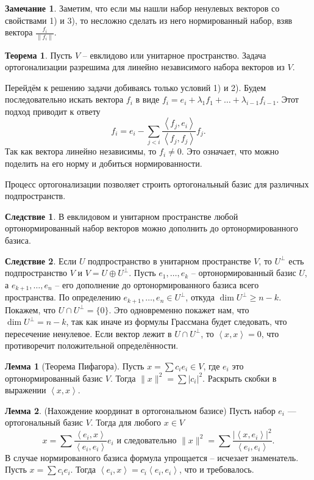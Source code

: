 \documentclass[10pt,a4paper,oneside]{book}
\theoremstyle{definition}
\newtheorem*{rem}{Замечание}
\newtheorem{thm}{Теорема}
\newtheorem{lem}{Лемма}
\newtheorem{cor}{Следствие}
\def\lan{\left\langle }
\def\ran{\right\rangle}
\def\thrm{\begin{thm}}
\def\ethrm{\end{thm}}
\def\lm{\begin{lem}}
\def\elm{\end{lem}}
\def\crl{\begin{cor}}
\def\ecrl{\end{cor}}
\def\rm{\begin{rem}}
\def\erm{\end{rem}}
\begin{document}
\rm Заметим, что если мы нашли набор ненулевых векторов со свойствами 1) и 3), то несложно сделать из него нормированный набор, взяв вектора $\frac{f_i}{\|f_i\|}$. 
\erm

\thrm Пусть $V$ -- евклидово или унитарное пространство. Задача ортогонализации разрешима для линейно независимого набора векторов из $V$.
\proof

Перейдём к решению задачи добиваясь только условий 1) и 2). Будем последовательно искать вектора $f_i$ в виде $f_i=e_i+\lambda_1 f_1 +\dots + \lambda_{i-1} f_{i-1}$. Этот подход приводит к ответу
$$f_i=e_i-\sum_{j<i} \frac{\lan f_j,e_i\ran}{\lan f_j,f_j\ran}f_j.$$
Так как вектора линейно независимы, то $f_i\neq 0$. Это означает, что можно поделить на его норму и добиться нормированности.
\endproof
\ethrm


Процесс ортогонализации позволяет строить ортогональный базис для различных подпространств.

\crl В евклидовом и унитарном пространстве любой ортонормированный набор векторов можно дополнить до ортонормированного базиса.
\ecrl

\crl Если $U$ подпространство в унитарном пространстве $V$, то $U^{\bot}$ есть подпространство $V$ и  $V= U \oplus U^{\bot}$. 
\proof Пусть $e_1,\dots,e_k$ -- ортонормированный базис $U$, а $e_{k+1}, \dots, e_n$ -- его дополнение до ортонормированного базиса всего пространства. По определению $e_{k+1},\dots,e_n \in U^{\bot}$, откуда $\dim U^{\bot} \geq n-k$. Покажем, что $U\cap U^{\bot}=\{0\}$. Это одновременно покажет нам, что $\dim U^{\bot}=n-k$, так как иначе из формулы Грассмана будет следовать, что пересечение ненулевое.
Если вектор лежит в $U\cap U^{\bot}$, то $\lan x,x\ran=0$, что противоречит положительной определённости.
\endproof
\ecrl

\lm[Теорема Пифагора] Пусть $x= \sum c_i e_i \in V$, где $e_i$ это ортонормированный базис $V$. Тогда $\|x\|^2=\sum |c_i|^2$.
\proof Раскрыть скобки в выражении $\lan x,x\ran$.
\endproof
\elm

\lm(Нахождение координат в ортогональном базисе) Пусть набор $e_i$ --- ортогональный базис $V$. Тогда для любого $x\in V$ 
$$x= \sum \frac{\lan e_i,  x\ran}{\lan e_i, e_i\ran}e_i \text{ и следовательно  } \|x\|^2= \sum \frac{|\lan x, e_i\ran|^2}{\lan e_i, e_i\ran}.$$
 В случае нормированного базиса формула упрощается -- исчезает знаменатель.
\proof Пусть $x=\sum c_i e_i$. Тогда $\lan e_i, x\ran = c_i \lan e_i,e_i \ran$, что и требовалось.
\endproof
\elm
\end{document}
